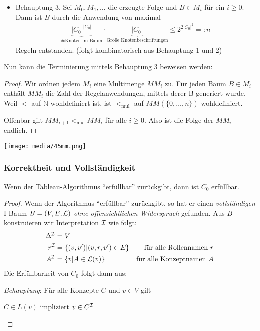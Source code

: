 \begin{itemize}
\item Behauptung 3.
  Sei $M_{0},M_1,\ldots$ die erzeugte Folge und $B \in M_i$ für
  ein $i \geq 0$. Dann ist $B$ durch die Anwendung von maximal
  \begin{align*}
      \underbrace{\left| C_{0} \right|^{\left| C_{0} \right|}}_\text{\# Knoten im Baum} \cdot \underbrace{\left| C_{0} \right|}_\text{Größe Knotenbeschriftungen} \leq 2^{2\left| C_{0} \right|^{2}} =: n
  \end{align*}
  Regeln entstanden. (folgt kombinatorisch aus Behauptung 1 und 2)

\end{itemize}

Nun kann die Terminierung mittels Behauptung 3 beweisen werden:

\begin{tafel}

\begin{proof}
    Wir ordnen jedem $M_i$ eine Multimenge $MM_i$ zu. Für jeden Baum $B \in
    M_i$ enthält $MM_i$ die Zahl der Regelanwendungen, mittels derer B
    generiert wurde.
    Weil $<$ auf $\mathbb{N}$ wohldefiniert ist, ist $<_{\text{mul}}$ auf $MM(\{0,\ldots,n\})$ wohldefiniert.

    Offenbar gilt $MM_{i+1} <_{\text{mul}} MM_i$ für alle $i \geq 0$. Also ist die Folge der $MM_i$ endlich.
\end{proof}

\texttt{[image: media/45mm.png]}
\end{tafel}

\subsubsection{Korrektheit und Vollständigkeit}

\begin{theorem}
    Wenn der Tableau-Algorithmus \enquote{erfüllbar} zurückgibt, dann ist $C_{0}$
erfüllbar.
\end{theorem}

\begin{proof}
    Wenn der Algorithmus \enquote{erfüllbar} zurückgibt, so hat er einen
    \emph{vollständigen} I-Baum $B = (V, E, \mathcal{L})$ \emph{ohne offensichtlichen
    Widerspruch} gefunden. Aus $B$ konstruieren wir Interpretation $\mathcal{I}$ wie
    folgt:
    \begin{align*}
        \Delta^\MI &= V\\
        r^\MI &= \left\{(v, v') \middle| (v, r, v') \in E\right\} & \text{für alle Rollennamen $r$}\\
        A^\MI &= \left\{v \middle| A \in \ML(v)\right\} & \text{für alle Konzeptnamen $A$}
    \end{align*}
    Die Erfüllbarkeit von $C_0$ folgt dann aus:

    \emph{Behauptung}: Für alle Konzepte $C$ und $v \in V$ gilt

    \begin{center}$C \in L\left( v \right)$ impliziert $v \in C^{\mathcal{I}}$\end{center}
\end{proof}


